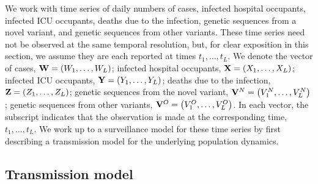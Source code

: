 We work with time series of daily numbers of cases, infected hospital occupants, infected ICU occupants, deaths due to the infection, genetic sequences from a novel variant, and genetic sequences from other variants.
These time series need not be observed at the same temporal resolution, but, for clear exposition in this section, we assume they are each reported at times \( t_1, \ldots, t_L \).
We denote the vector of cases, \( \mathbf{W} = \left( W_1, \ldots, W_L \right) \); infected hospital occupants, \( \mathbf{X} = \left( X_1, \ldots, X_L \right) \); infected ICU occupants, \( \mathbf{Y} = \left( Y_1, \ldots, Y_L \right) \); deaths due to the infection, \( \mathbf{Z} = \left( Z_1, \ldots, Z_L \right) \); genetic sequences from the novel variant, \( \mathbf{V}^N =  \left( V^N_1, \ldots, V^N_L \right)\); genetic sequences from other variants, \( \mathbf{V}^O =  \left( V^O_1, \ldots, V^O_L \right)\). In each vector, the subscript indicates that the observation is made at the corresponding time, \( t_1, \ldots, t_L \).
We work up to a surveillance model for these time series by first describing a transmission model for the underlying population dynamics.

\subsection{Transmission model}
\label{ch_5:subsec:transmission}

